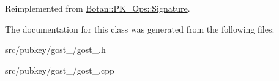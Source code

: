 Reimplemented from \hyperlink{classBotan_1_1PK__Ops_1_1Signature_a0796a0e53462052c38c5cf961d272327}{Botan\-::\-P\-K\-\_\-\-Ops\-::\-Signature}.



The documentation for this class was generated from the following files\-:\begin{DoxyCompactItemize}
\item 
src/pubkey/gost\-\_/gost\-\_.\-h\item 
src/pubkey/gost\-\_/gost\-\_.\-cpp\end{DoxyCompactItemize}
